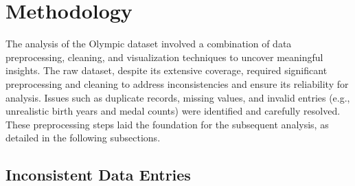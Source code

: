 \chapter{Methodology} \label{chap:method}

The analysis of the Olympic dataset involved a combination of data preprocessing, cleaning, and visualization techniques to uncover meaningful insights. The raw dataset, despite its extensive coverage, required significant preprocessing and cleaning to address inconsistencies and ensure its reliability for analysis. Issues such as duplicate records, missing values, and invalid entries (e.g., unrealistic birth years and medal counts) were identified and carefully resolved. These preprocessing steps laid the foundation for the subsequent analysis, as detailed in the following subsections.




\section{Inconsistent Data Entries}

